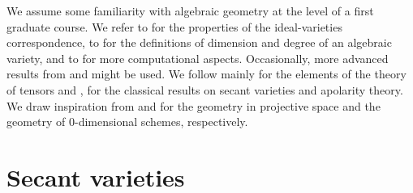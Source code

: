 We assume some familiarity with algebraic geometry at the level of a first graduate course. We refer to \cite{Sha94} for the properties of the ideal-varieties correspondence, to \cite{Har92} for the definitions of dimension and degree of an algebraic variety, and to \cite{CLO07} for more computational aspects. Occasionally, more advanced results from \cite{Mum76} and \cite{Vak24} might be used. We follow mainly \cite{Lan12} for the elements of the theory of tensors and \cite{BCCGO18}, \cite{CGO14} for the classical results on secant varieties and apolarity theory. We draw inspiration from \cite{Rus16} and \cite{IK99} for the geometry in projective space and the geometry of $0$-dimensional schemes, respectively.

\chapter{Secant varieties}
\label{classicalAG-chapter-SecantVarieties}



% 
% 
% 
% 
% 


% 

